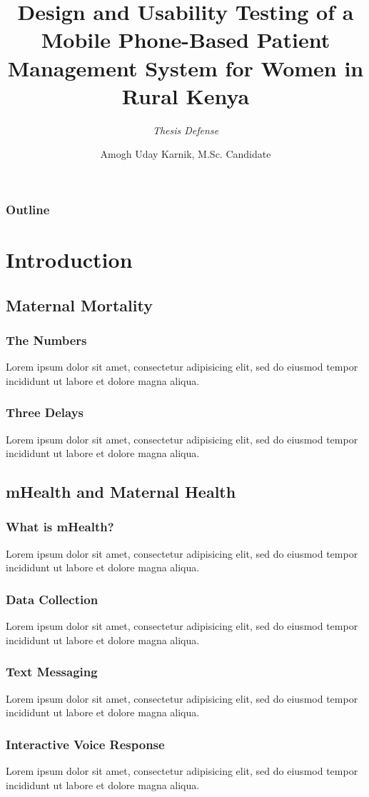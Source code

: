 \documentclass{beamer}
\author[A. Karnik]{Amogh Uday Karnik,  M.Sc. Candidate}
\title{Design and Usability Testing of a Mobile Phone-Based Patient Management System for Women in Rural Kenya}
\subtitle{\textit{Thesis Defense}}
\institute[DGHI]{Duke Global Health Institute \\ Duke University}
\begin{document}
\begin{frame}[plain]
\titlepage
\end{frame}

\begin{frame}[plain]
\frametitle{Outline}
\tableofcontents
\end{frame}

\section{Introduction}
\subsection{Maternal Mortality}

\begin{frame}
\frametitle{The Numbers}
Lorem ipsum dolor sit amet, consectetur adipisicing elit, sed do eiusmod tempor incididunt ut labore et dolore magna aliqua.
\end{frame}

\begin{frame}
\frametitle{Three Delays}
Lorem ipsum dolor sit amet, consectetur adipisicing elit, sed do eiusmod tempor incididunt ut labore et dolore magna aliqua.
\end{frame}

\subsection{mHealth and Maternal Health}
\begin{frame}
\frametitle{What is mHealth?}
Lorem ipsum dolor sit amet, consectetur adipisicing elit, sed do eiusmod tempor incididunt ut labore et dolore magna aliqua.
\end{frame}

\begin{frame}
\frametitle{Data Collection}
Lorem ipsum dolor sit amet, consectetur adipisicing elit, sed do eiusmod tempor incididunt ut labore et dolore magna aliqua.
\end{frame}

\begin{frame}
\frametitle{Text Messaging}
Lorem ipsum dolor sit amet, consectetur adipisicing elit, sed do eiusmod tempor incididunt ut labore et dolore magna aliqua.
\end{frame}

\begin{frame}
\frametitle{Interactive Voice Response}
Lorem ipsum dolor sit amet, consectetur adipisicing elit, sed do eiusmod tempor incididunt ut labore et dolore magna aliqua.
\end{frame}
\end{document}
